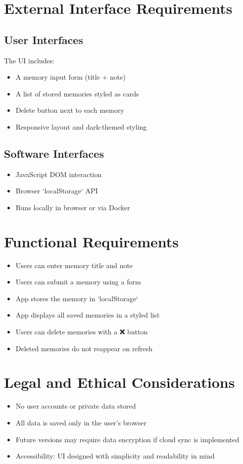 \documentclass[12pt]{article}
\begin{document}
\section{External Interface Requirements}

\subsection*{User Interfaces}
The UI includes:
\begin{itemize}
    \item A memory input form (title + note)
    \item A list of stored memories styled as cards
    \item Delete button next to each memory
    \item Responsive layout and dark-themed styling
\end{itemize}

\subsection*{Software Interfaces}
\begin{itemize}
    \item JavaScript DOM interaction
    \item Browser `localStorage` API
    \item Runs locally in browser or via Docker
\end{itemize}

\section{Functional Requirements}
\begin{itemize}
    \item Users can enter memory title and note
    \item Users can submit a memory using a form
    \item App stores the memory in `localStorage`
    \item App displays all saved memories in a styled list
    \item Users can delete memories with a ❌ button
    \item Deleted memories do not reappear on refresh
\end{itemize}

\section{Legal and Ethical Considerations}
\begin{itemize}
    \item No user accounts or private data stored
    \item All data is saved only in the user's browser
    \item Future versions may require data encryption if cloud sync is implemented
    \item Accessibility: UI designed with simplicity and readability in mind
\end{itemize}
\end{document}
